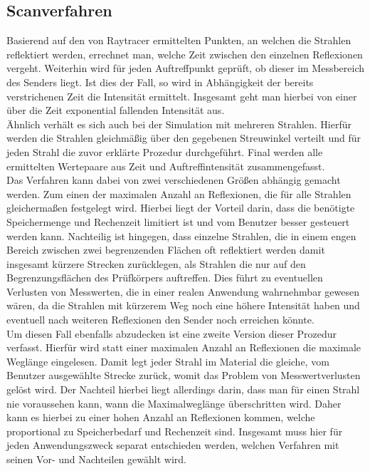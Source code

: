 \documentclass[12pt,a4paper]{scrartcl}
\begin{document}
\subsection{Scanverfahren}
Basierend auf den von Raytracer ermittelten Punkten, an welchen die Strahlen reflektiert werden, errechnet man, welche Zeit zwischen den einzelnen Reflexionen vergeht.
Weiterhin wird für jeden Auftreffpunkt geprüft, ob dieser im Messbereich des Senders liegt. 
Ist dies der Fall, so wird in Abhängigkeit der bereits verstrichenen Zeit die Intensität ermittelt. 
Insgesamt geht man hierbei von einer über die Zeit exponential fallenden Intensität aus.\\
Ähnlich verhält es sich auch bei der Simulation mit mehreren Strahlen. 
Hierfür werden die Strahlen gleichmäßig über den gegebenen Streuwinkel verteilt und für jeden Strahl die zuvor erklärte Prozedur durchgeführt. 
Final werden alle ermittelten Wertepaare aus Zeit und Auftreffintensität zusammengefasst.\\
Das Verfahren kann dabei von zwei verschiedenen Größen abhängig gemacht werden. 
Zum einen der maximalen Anzahl an Reflexionen, die für alle Strahlen gleichermaßen festgelegt wird. Hierbei liegt der Vorteil darin, dass die benötigte Speichermenge und Rechenzeit limitiert ist und vom Benutzer besser gesteuert werden kann. 
Nachteilig ist hingegen, dass einzelne Strahlen, die in einem engen Bereich zwischen zwei begrenzenden Flächen oft reflektiert werden damit insgesamt kürzere Strecken zurücklegen, als Strahlen die nur auf den Begrenzungsflächen des Prüfkörpers auftreffen. 
Dies führt zu eventuellen Verlusten von Messwerten, die in einer realen Anwendung wahrnehmbar gewesen wären, da die Strahlen mit kürzerem Weg noch eine höhere Intensität haben und eventuell nach weiteren Reflexionen den Sender noch erreichen könnte.\\
Um diesen Fall ebenfalls abzudecken ist eine zweite Version dieser Prozedur verfasst. 
Hierfür wird statt einer maximalen Anzahl an Reflexionen die maximale Weglänge eingelesen. 
Damit legt jeder Strahl im Material die gleiche, vom Benutzer ausgewählte Strecke zurück, womit das Problem von Messwertverlusten gelöst wird. 
Der Nachteil hierbei liegt allerdings darin, dass man für einen Strahl nie voraussehen kann, wann die Maximalweglänge überschritten wird. 
Daher kann es hierbei zu einer hohen Anzahl an Reflexionen kommen, welche proportional zu Speicherbedarf und Rechenzeit sind. 
Insgesamt muss hier für jeden Anwendungszweck separat entschieden werden, welchen Verfahren mit seinen Vor- und Nachteilen gewählt wird.\\
\end{document}
